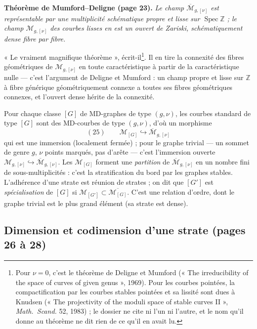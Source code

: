 \documentclass[11pt,a4paper]{article}
\begin{document}
\textbf{Théorème de Mumford--Deligne (page 23).} \emph{Le champ
$\overline{\mathcal{M}}_{g,[\nu]}$ est représentable par une multiplicité
schématique propre et lisse sur $\operatorname{Spec} \mathbb{Z}$ ; le champ
$\mathcal{M}_{g,[\nu]}$ des courbes lisses en est un ouvert de Zariski,
schématiquement dense fibre par fibre.}

« Le vraiment magnifique théorème », écrit-il\footnote{Pour $\nu = 0$, c'est le
théorème de Deligne et Mumford (« The irreducibility of the space of curves of
given genus », 1969). Pour les courbes pointées, la compactification par les
courbes stables pointées et sa lissité sont dues à Knudsen (« The projectivity of
the moduli space of stable curves II », \emph{Math.\ Scand.} 52, 1983) ; le
dossier ne cite ni l'un ni l'autre, et le nom qu'il donne au théorème ne dit rien
de ce qu'il en avait lu.}. Il en tire la connexité des fibres géométriques de
$\mathcal{M}_{g,[\nu]}$ en toute caractéristique à partir de la caractéristique
nulle — c'est l'argument de Deligne et Mumford : un champ propre et lisse sur
$\mathbb{Z}$ à fibre générique géométriquement connexe a toutes ses fibres
géométriques connexes, et l'ouvert dense hérite de la connexité.

Pour chaque classe $[G]$ de MD-graphes de type $(g, \nu)$, les courbes standard
de type $[G]$ sont des MD-courbes de type $(g, \nu)$, d'où un morphisme
\[
(25) \qquad \mathcal{M}_{[G]} \hookrightarrow \overline{\mathcal{M}}_{g,[\nu]}
\]
qui est une immersion (localement fermée) ; pour le graphe trivial — un sommet
de genre $g$, $\nu$ points marqués, pas d'arête — c'est l'immersion ouverte
$\mathcal{M}_{g,[\nu]} \hookrightarrow \overline{\mathcal{M}}_{g,[\nu]}$. Les
$\mathcal{M}_{[G]}$ forment une \emph{partition} de $\overline{\mathcal{M}}_{g,[\nu]}$
en un nombre fini de sous-multiplicités : c'est la stratification du bord par
les graphes stables. L'adhérence d'une strate est réunion de strates ; on dit
que $[G']$ est \emph{spécialisation} de $[G]$ si $\mathcal{M}_{[G']} \subset
\overline{\mathcal{M}_{[G]}}$. C'est une relation d'ordre, dont le graphe
trivial est le plus grand élément (sa strate est dense).

\subsection*{Dimension et codimension d'une strate (pages 26 à 28)}
\end{document}
